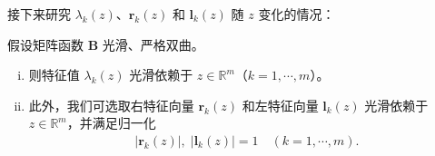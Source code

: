 \documentclass[../../main.tex]{subfiles}
\begin{document}
接下来研究 $\lambda_k(z)$、$\mathbf{r}_k(z)$ 和 $\mathbf{l}_k(z)$ 随 $z$ 变化的情况：

\begin{theorem}[特征值和特征向量对参数的依赖性。]\label{theorem:ch11-特征值光滑依赖}假设矩阵函数 $\mathbf{B}$ 光滑、严格双曲。
\begin{enumerate}[(i)]
\item 则特征值 $\lambda_k(z)$ 光滑依赖于 $z\in\mathbb{R}^m$（$k=1,\cdots,m$）。
\item 此外，我们可选取右特征向量 $\mathbf{r}_k(z)$ 和左特征向量 $\mathbf{l}_k(z)$ 光滑依赖于 $z\in\mathbb{R}^m$，并满足归一化
\begin{align*}
|\mathbf{r}_k(z)|,\;|\mathbf{l}_k(z)|=1 \quad (k=1,\cdots,m).
\end{align*}
\end{enumerate}
\end{theorem}
\end{document}
